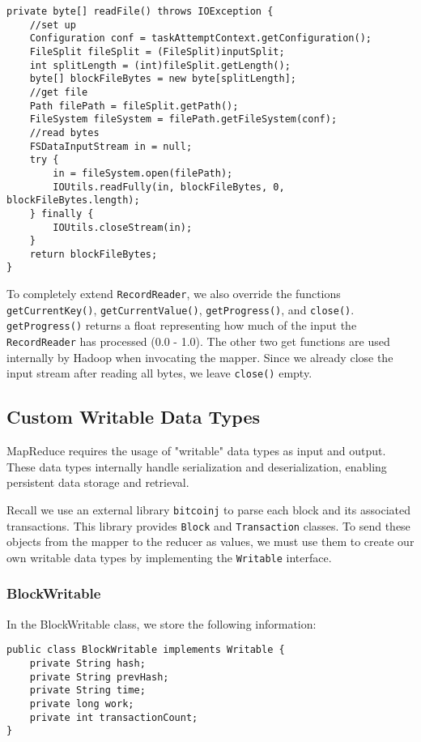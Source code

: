 \documentclass[9pt,twocolumn,twoside]{idsi}
\begin{document}
\begin{lstlisting}
private byte[] readFile() throws IOException {
    //set up
    Configuration conf = taskAttemptContext.getConfiguration();
    FileSplit fileSplit = (FileSplit)inputSplit;
    int splitLength = (int)fileSplit.getLength();
    byte[] blockFileBytes = new byte[splitLength];
    //get file
    Path filePath = fileSplit.getPath();
    FileSystem fileSystem = filePath.getFileSystem(conf);
    //read bytes
    FSDataInputStream in = null;
    try {
        in = fileSystem.open(filePath);
        IOUtils.readFully(in, blockFileBytes, 0, blockFileBytes.length);
    } finally {
        IOUtils.closeStream(in);
    }
    return blockFileBytes;
}
\end{lstlisting}


To completely extend \lstinline{RecordReader}, we also override the functions \lstinline{getCurrentKey()}, \lstinline{getCurrentValue()}, \lstinline{getProgress()}, and \lstinline{close()}. \lstinline{getProgress()} returns a float representing how much of the input the \lstinline{RecordReader} has processed (0.0 - 1.0). The other two get functions are used internally by Hadoop when invocating the mapper. Since we already close the input stream after reading all bytes, we leave \lstinline{close()} empty.

\subsection{Custom Writable Data Types}

MapReduce requires the usage of "writable" data types as input and output. These data types internally handle serialization and deserialization, enabling persistent data storage and retrieval.

Recall we use an external library \lstinline{bitcoinj} to parse each block and its associated transactions. This library provides \lstinline{Block} and \lstinline{Transaction} classes. To send these objects from the mapper to the reducer as values, we must use them to create our own writable data types by implementing the \lstinline{Writable} interface.

\subsubsection{BlockWritable}
In the BlockWritable class, we store the following information:

\begin{lstlisting}
public class BlockWritable implements Writable {
    private String hash;
    private String prevHash;
    private String time;
    private long work;
    private int transactionCount;
}
\end{lstlisting}
\end{document}
